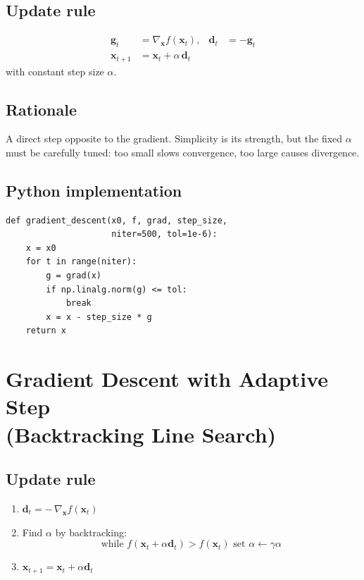 \documentclass[12pt]{article}
\begin{document}
\subsection*{Update rule}
\begin{align}
\bm g_t      &=\nabla_{\!\bm x}f(\bm x_t), &
\bm d_t &= -\bm g_t \\
\bm x_{t+1}  &=\bm x_t+\alpha\,\bm d_t
\end{align}
with constant step size $\alpha$.

\subsection*{Rationale}
A direct step opposite to the gradient.  Simplicity is its strength, but the
fixed $\alpha$ must be carefully tuned: too small slows convergence, too large
causes divergence.

\subsection*{Python implementation}
\begin{lstlisting}
def gradient_descent(x0, f, grad, step_size,
                     niter=500, tol=1e-6):
    x = x0
    for t in range(niter):
        g = grad(x)
        if np.linalg.norm(g) <= tol:
            break
        x = x - step_size * g
    return x
\end{lstlisting}

\section{Gradient Descent with Adaptive Step\\(Backtracking Line Search)}
\subsection*{Update rule}
\begin{enumerate}
  \item $\bm d_t = -\,\nabla_{\!\bm x}f(\bm x_t)$
  \item Find $\alpha$ by backtracking:
        \[
        \text{while } f(\bm x_t+\alpha\bm d_t) > f(\bm x_t)
        \text{ set } \alpha \leftarrow \gamma\alpha
        \]
  \item $\bm x_{t+1} = \bm x_t + \alpha \bm d_t$
\end{enumerate}
\end{document}
